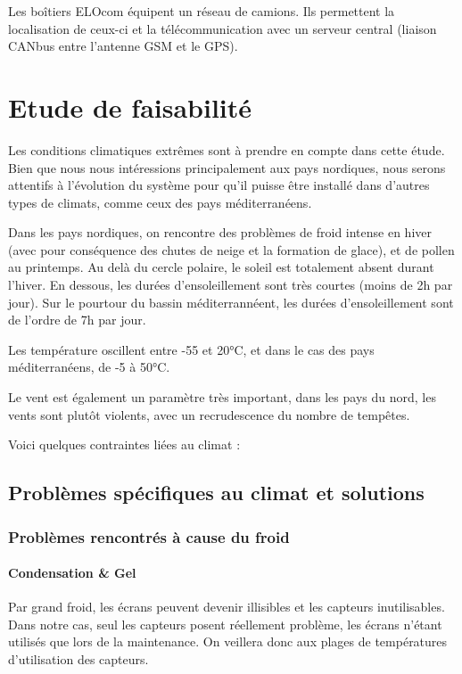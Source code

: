Les boîtiers ELOcom équipent un réseau de camions. Ils permettent la localisation de ceux-ci et la télécommunication avec un serveur central (liaison CANbus entre l'antenne GSM et le GPS).

\section{Etude de faisabilité}

Les conditions climatiques extrêmes sont à prendre en compte dans cette étude. Bien que nous nous intéressions principalement aux pays nordiques, nous serons attentifs à l'évolution du système pour qu'il puisse être installé dans d'autres types de climats, comme ceux des pays méditerranéens.

Dans les pays nordiques, on rencontre des problèmes de froid intense en hiver (avec pour conséquence des chutes de neige et la formation de glace), et de pollen au printemps. Au delà du cercle polaire, le soleil est totalement absent durant l'hiver. En dessous, les durées d'ensoleillement sont très courtes (moins de 2h par jour). Sur le pourtour du bassin méditerrannéent, les durées d'ensoleillement sont de l'ordre de 7h par jour.

Les température oscillent entre -55 et 20°C, et dans le cas des pays méditerranéens, de -5 à 50°C.

Le vent est également un paramètre très important, dans les pays du nord, les vents sont plutôt violents, avec un recrudescence du nombre de tempêtes.

Voici quelques contraintes liées au climat :

\subsection{Problèmes spécifiques au climat et solutions}

\subsubsection{Problèmes rencontrés à cause du froid}

\paragraph{Condensation \&  Gel}

Par grand froid, les écrans peuvent devenir illisibles et les capteurs inutilisables. Dans notre cas, seul les capteurs posent réellement problème, les écrans n'étant utilisés que lors de la maintenance. On veillera donc aux plages de températures d'utilisation des capteurs.


